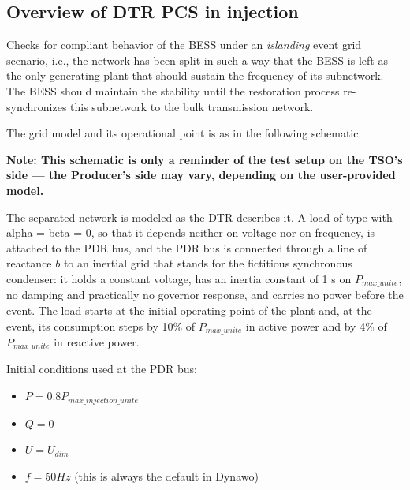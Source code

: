     \subsection{Overview of DTR PCS \DTRPcs{} in injection}

    Checks for compliant behavior of the BESS under an \emph{islanding} event grid
    scenario, i.e., the network has been split in such a way that the BESS is left as
    the only generating plant that should sustain the frequency of its
    subnetwork. The BESS should maintain the stability until the restoration process
    re-synchronizes this subnetwork to the bulk transmission network.

    The grid model and its operational point is as in the following schematic:
    \begin{center}
        
    \end{center}
    \begin{center}
        \small \textbf{Note: This schematic is only a reminder of the test setup on the TSO's
        side --- the Producer's side may vary, depending on the user-provided model.}
    \end{center}

    The separated network is modeled as the DTR describes it. A load of type
     with alpha = beta = 0, so that it depends neither on
    voltage nor on frequency, is attached to the PDR bus, and the PDR bus is
    connected through a line of reactance $b$ to an inertial grid that stands
    for the fictitious synchronous condenser: it holds a constant voltage, has
    an inertia constant of 1 s on $P_{max\_unite}$, no damping and practically
    no governor response, and carries no power before the event. The load
    starts at the initial operating point of the plant and, at the event, its
    consumption steps by 10\% of $P_{max\_unite}$ in active power and by 4\%
    of $P_{max\_unite}$ in reactive power.

    \begin{description}
        \item Initial conditions used at the PDR bus:
        \begin{itemize}
            \item $P = 0.8 P_{max\_injection\_unite}$
            \item $Q = 0$
            \item $U = U_{dim}$
            \item $f = 50 Hz$ (this is always the default in Dynawo)
        \end{itemize}
    \end{description}

